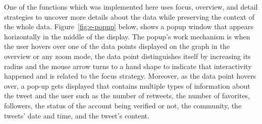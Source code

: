 
One of the functions which was implemented here uses focus, overview, and detail strategies to uncover more details about the data while preserving the context of the whole data. Figure~\ref{fig:e-popup} below, shows a popup window that appears horizontally in the middle of the display. The popup's work mechanism is when the user hovers over one of the data points displayed on the graph in the overview or any zoom mode, the data point distinguishes itself by increasing its radius and the mouse arrow turns to a hand shape to indicate that interactivity happened and is related to the focus strategy. Moreover, as the data point hovers over, a pop-up gets displayed that contains multiple types of information about the tweet and the user such as the number of retweets, the number of favorites, followers, the status of the account being verified or not, the community, the tweets' date and time, and the tweet's content. 



